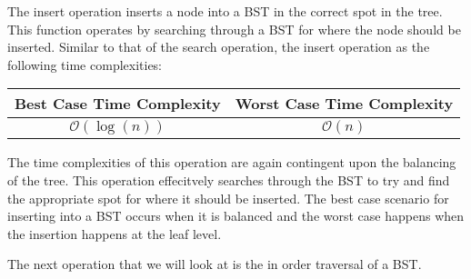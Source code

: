 \begin{highlight}
The insert operation inserts a node into a BST in the correct spot in the tree. This function operates by searching through a BST for where the node should be inserted. Similar to that of the search
operation, the insert operation as the following time complexities: \newline

\begin{center}
    \begin{tabular}[ht]{|c|c|}
        \hline \textbf{Best Case Time Complexity} & \textbf{Worst Case Time Complexity} \\ \hline
        $\mathcal{O}(\log{(n)})$ & $\mathcal{O}(n)$ \\ \hline
    \end{tabular}
\end{center}

\noindent The time complexities of this operation are again contingent upon the balancing of the tree. This operation effecitvely searches through the BST to try and find the appropriate spot for where
it should be inserted. The best case scenario for inserting into a BST occurs when it is balanced and the worst case happens when the insertion happens at the leaf level.

\end{highlight}

The next operation that we will look at is the in order traversal of a BST.

